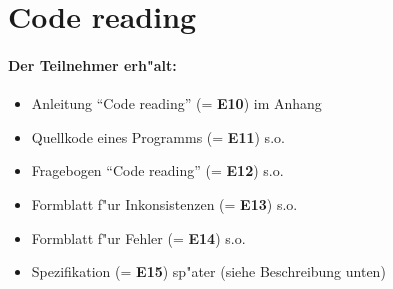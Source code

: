 \newpage
\section*{Code reading}

\paragraph{Der Teilnehmer erh"alt:}  
\begin{itemize}
	\item Anleitung "`Code reading"' (= {\bf E10}) im Anhang
	\item Quellkode eines Programms (= {\bf E11}) s.o.
	\item Fragebogen "`Code reading"' (= {\bf E12}) s.o.
	\item Formblatt f"ur Inkonsistenzen (= {\bf E13}) s.o.
	\item Formblatt f"ur Fehler (= {\bf E14}) s.o.
	\item Spezifikation (= {\bf E15}) sp"ater (siehe Beschreibung unten)
\end{itemize}

